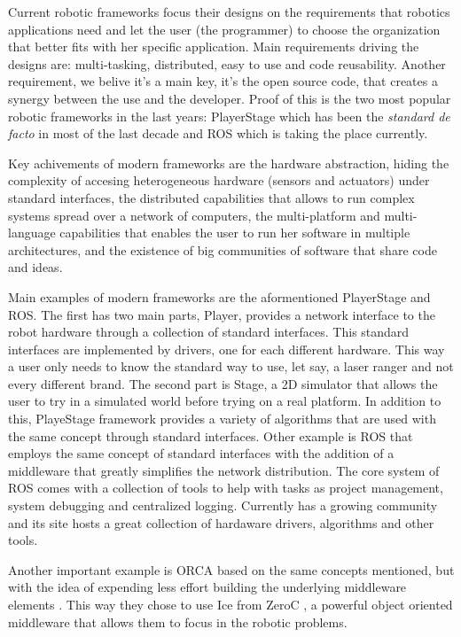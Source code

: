 \documentclass[twocolumn]{svjour3}          %
\begin{document}
Current robotic frameworks focus their designs on the requirements
that robotics applications need and let the user (the programmer) to
choose the organization that better fits with her specific
application. Main requirements driving the designs are: multi-tasking, distributed, easy to
use and code reusability. Another requirement, we belive it's a main
key, it's the open source code, that creates a synergy between the use
and the developer. Proof of this is the two most popular robotic
frameworks in the last years: PlayerStage
\cite{Gerkey03,collet05,vaughan2007} which has been the \textit{standard de
facto} in most of the last decade and ROS \cite{quigley09} which is
taking the place currently.

Key achivements of modern frameworks are the hardware abstraction, hiding the complexity of accesing heterogeneous hardware (sensors and
actuators) under standard interfaces, the distributed capabilities
that allows to run complex systems spread over a network of computers,
the multi-platform and multi-language capabilities that enables the
user to run her software in multiple architectures, and the existence
of big communities of software that share code and ideas.

Main examples of modern frameworks are the aformentioned PlayerStage
and ROS. The first has two main parts, Player, provides a network
interface to the robot hardware through a collection of standard
interfaces. This standard interfaces are implemented by drivers, one
for each different hardware. This way a user only needs to know the
standard way to use, let say, a laser ranger and not every different
brand. The second part is Stage, a 2D simulator that allows the user
to try in a simulated world before trying on a real platform. In
addition to this, PlayeStage framework provides a variety of
algorithms that are used with the same concept through standard
interfaces. Other example is ROS that employs the same concept of
standard interfaces with the addition of a middleware that greatly
simplifies the network distribution. The core system of ROS comes with
a collection of tools to help with tasks as project management, system
debugging and centralized logging. Currently has a growing community
and its site hosts a great collection of hardaware drivers, algorithms
and other tools.

Another important example is ORCA \cite{brooks05,brooks07} based on the
same concepts mentioned, but with the idea of expending less effort
building the underlying middleware elements . This way they chose to
use Ice from ZeroC \cite{henning04}, a powerful object oriented middleware
that allows them to focus in the robotic problems.
\end{document}
